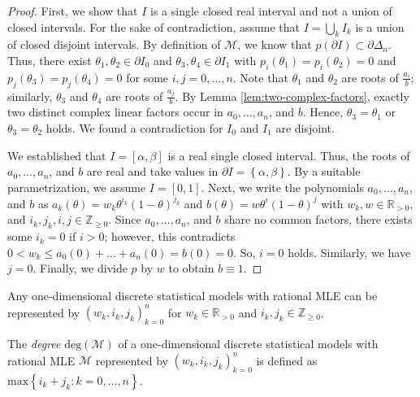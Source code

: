 \begin{proof}
    First, we show that \( I \) is a single closed real interval and not a union of closed intervals. For the sake of contradiction, assume that \( I = \bigcup_{k} I_k \) is a union of closed disjoint intervals. By definition of \( \mathcal{M} \), we know that \( p(\partial I) \subset \partial \Delta_n \). Thus, there exist \( \theta_1, \theta_2 \in \partial I_0 \) and \( \theta_3, \theta_4 \in \partial I_1 \) with \( p_i(\theta_1) = p_i(\theta_2) =  0 \) and \( p_j(\theta_3) = p_j(\theta_4) = 0 \) for some \( i,j = 0, \dots, n \). Note that \( \theta_1 \) and \( \theta_2 \) are roots of \( \frac{a_i}{b} \); similarly,  \( \theta_3 \) and \( \theta_4 \) are roots of \( \frac{a_j}{b} \). By Lemma \ref{lem:two-complex-factors}, exactly two distinct complex linear factors occur in \( a_0, \dots, a_n \), and \( b \). Hence, \( \theta_3 = \theta_1 \) or \( \theta_3 = \theta_2 \) holds. We found a contradiction for \( I_0 \) and \( I_1 \) are disjoint.

    We established that \( I = [\alpha, \beta ]\) is a real single closed interval. Thus, the roots of \( a_0, \dots, a_n\), and \( b \) are real and take values in \( \partial I = \left\{ \alpha, \beta \right\} \). By a suitable parametrization, we assume \( I = [0,1] \). Next, we write the polynomials \( a_0, \dots, a_n\), and \( b \) as \(  a_k(\theta) = w_k \theta^{i_k} (1-\theta)^{j_k} \) and \( b(\theta) = w \theta^{i} (1-\theta)^{j} \)
    with \( w_k, w \in \mathbb{R}_{>0} \), and \( i_k, j_k, i, j \in \mathbb{Z}_{\geq 0} \). Since \( a_0, \dots, a_n\), and \( b \) share no common factors, there exists some \( i_k = 0 \) if \( i > 0 \); however, this contradicts \(0 < w_k \leq a_0(0) + \dots + a_n(0) = b(0) = 0\). So, \( i = 0 \) holds. Similarly, we have \( j = 0 \). Finally, we divide \( p \) by \( w \) to obtain \( b \equiv 1 \).
\end{proof}

\begin{corollary}
    Any one-dimensional {discrete} {statistical} {models} with rational MLE can be represented by \( (w_k, i_k, j_k)_{k=0}^n \) for \( w_k \in \mathbb{R}_{>0} \) and \( i_k, j_k \in \mathbb{Z}_{\geq 0} \).
\end{corollary}

\begin{definition}
    The \emph{degree} \( \mathrm{deg}(\mathcal{M}) \) of a one-dimensional discrete statistical models with rational MLE \( \mathcal{M} \) represented by \( (w_k, i_k, j_k)_{k=0}^n \) is defined as \( \mathrm{max}\left\{ i_k + j_k : k = 0, \dots, n \right\} \).
\end{definition}

